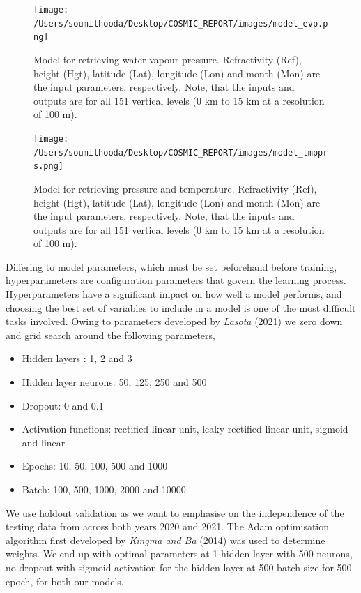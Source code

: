 \documentclass[a4paper,12pt,twoside]{article}
\begin{document}
\begin{figure}[H]
	\centering
	\begin{minipage}{0.45\textwidth}
		\centering
		\texttt{[image: /Users/soumilhooda/Desktop/COSMIC\_REPORT/images/model\_evp.png]}
		\caption{Model for retrieving water vapour pressure. Refractivity (Ref), height (Hgt), latitude (Lat), longitude (Lon) and month (Mon) are the input parameters, respectively. Note, that the inputs and outputs are for all 151 vertical levels (0 km to 15 km at a resolution of 100 m).}
		\label{fig:img6}
	\end{minipage}
	\hfill
	\begin{minipage}{0.45\textwidth}
		\centering
		\texttt{[image: /Users/soumilhooda/Desktop/COSMIC\_REPORT/images/model\_tmpprs.png]}
		\caption{Model for retrieving pressure and temperature. Refractivity (Ref), height (Hgt), latitude (Lat), longitude (Lon) and month (Mon) are the input parameters, respectively. Note, that the inputs and outputs are for all 151 vertical levels (0 km to 15 km at a resolution of 100 m).}
		\label{fig:img7}
	\end{minipage}
\end{figure}

\noindent  Differing to model parameters, which must be set beforehand before training, hyperparameters are configuration parameters that govern the learning process.
Hyperparameters have a significant impact on how well a model performs, and choosing the best set of variables to include in a model is one of the most difficult tasks involved. Owing to parameters developed by \textit{Lasota} (2021) we zero down and grid search around the following parameters,
\begin{itemize}
	\item Hidden layers : 1, 2 and 3
	\item Hidden layer neurons: 50, 125, 250 and 500
	\item Dropout: 0 and 0.1
	\item Activation functions: rectified linear unit, leaky rectified linear unit, sigmoid and linear
	\item Epochs: 10, 50, 100, 500 and 1000
	\item Batch: 100, 500, 1000, 2000 and 10000
\end{itemize}

\noindent We use holdout validation as we want to emphasise on the independence of the testing data from across both years 2020 and 2021. The Adam optimisation algorithm first developed by \textit{Kingma and Ba} (2014) was used to determine weights. We end up with optimal parameters at 1 hidden layer with 500 neurons, no dropout with sigmoid activation for the hidden layer at 500 batch size for 500 epoch, for both our models. \\
\end{document}
